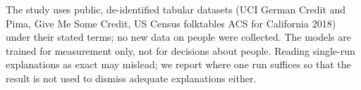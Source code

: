 The study uses public, de-identified tabular datasets (UCI German Credit and Pima, Give Me Some Credit, US Census folktables ACS for California 2018) under their stated terms; no new data on people were collected. The models are trained for measurement only, not for decisions about people. Reading single-run explanations as exact may mislead; we report where one run suffices so that the result is not used to dismiss adequate explanations either.
